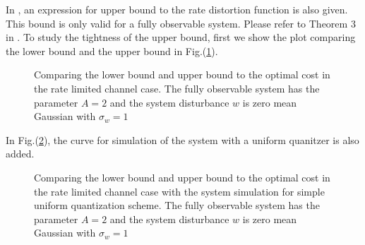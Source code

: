 \documentclass[12pt]{caltech_thesis_progress2}
\begin{document}
In \cite{victoria}, an expression for upper bound to the rate distortion function is also given. This bound is only valid for a fully observable system. Please refer to Theorem 3 in \cite{victoria}.	
	To study the tightness of the upper bound, first we show the plot comparing the lower bound and the upper bound in Fig.(\ref{lower_upper}).
	\begin{figure}[H]

			  \centering
%			  
			  \tiny{
			}
			  \caption{Comparing the lower bound and upper bound to the optimal cost in the rate limited channel case. The fully observable system has the parameter $A = 2$ and the system disturbance $w$ is zero mean Gaussian with $\sigma_{w} = 1$}
			 \label{lower_upper}
		\end{figure}	
		In Fig.(\ref{lower_upper_sim}), the curve for simulation of the system with a uniform quanitzer is also added.
		\begin{figure}[H]
			  \centering
%			  
			  \tiny{
			}
			  \caption{Comparing the lower bound and upper bound to the optimal cost in the rate limited channel case with the system simulation for simple uniform quantization scheme. The fully observable system has the parameter $A = 2$ and the system disturbance $w$ is zero mean Gaussian with $\sigma_{w} = 1$}
			 \label{lower_upper_sim}
		\end{figure}	
		
\end{document}
